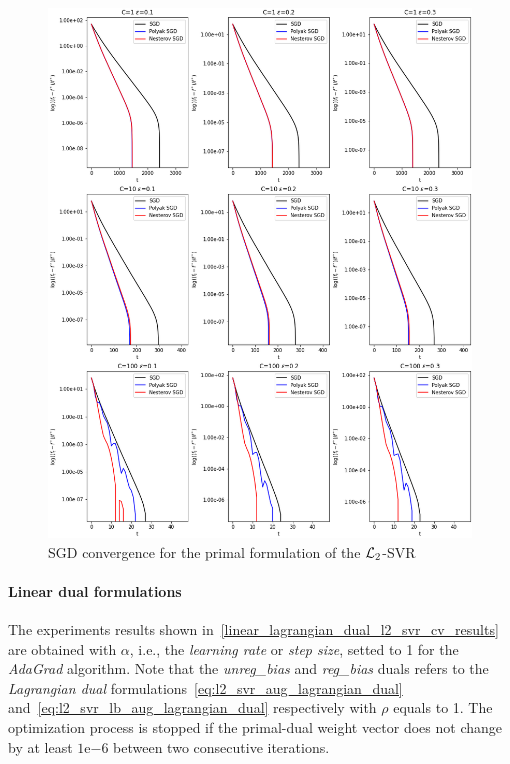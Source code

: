 

\begin{figure}[H]
	\centering
	\includegraphics[scale=0.5]{img/l2_svr_loss_history}
	\caption{SGD convergence for the primal formulation of the $\protect \mathcal{L}_2$-SVR}
	\label{fig:l2_svr_loss_history}
\end{figure}

\pagebreak

\paragraph{Linear dual formulations}

The experiments results shown in~\ref{linear_lagrangian_dual_l2_svr_cv_results} are obtained with $\alpha$, i.e., the \emph{learning rate} or \emph{step size}, setted to 1 for the \emph{AdaGrad} algorithm. Note that the \emph{unreg\_bias} and \emph{reg\_bias} duals refers to the \emph{Lagrangian dual} formulations~\eqref{eq:l2_svr_aug_lagrangian_dual} and~\eqref{eq:l2_svr_lb_aug_lagrangian_dual} respectively with $\rho$ equals to 1. The optimization process is stopped if the primal-dual weight vector does not change by at least $1\mathrm{e}{-6}$  between two consecutive iterations.

